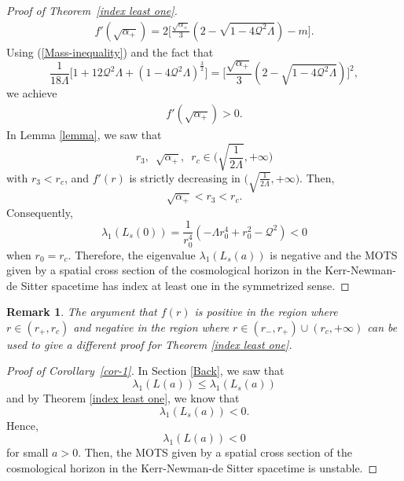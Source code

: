 \documentclass[a4paper, 11pt, reqno]{amsart}
\newtheorem{remark}{Remark}
\begin{document}
\begin{proof}[Proof of Theorem~\ref{index least one}]
\begin{eqnarray*}
    f'(\sqrt{\alpha_{+}})=
    2\Bigg[\frac{\sqrt{\alpha_{+}}}{3}(2-\sqrt{1-4\mathcal{Q}^2\Lambda})-m\Bigg].
\end{eqnarray*}
Using (\ref{Mass-inequality}) and the fact that
\begin{equation*}
    \frac{1}{18\Lambda}\Big[1+12\mathcal{Q}^2\Lambda+(1-4\mathcal{Q}^2\Lambda)^{\frac{3}{2}}\Big]=\Bigg[\frac{\sqrt{\alpha_{+}}}{3}(2-\sqrt{1-4\mathcal{Q}^2\Lambda})\Bigg]^2,
\end{equation*}
we achieve
\begin{eqnarray*}
    f'(\sqrt{\alpha_{+}})>0.
\end{eqnarray*}
In Lemma \ref{lemma}, we saw that
$$r_3,\,\,\,\sqrt{\alpha_{+}},\,\,\, r_c\in\Big(\sqrt{\frac{1}{2\Lambda}},+\infty\Big)$$
with $r_3<r_c$, and $f'(r)$ is strictly decreasing in $\Big(\sqrt{\frac{1}{2\Lambda}},+\infty\Big)$. Then,
$$\sqrt{\alpha_{+}}<r_3<r_c.$$
Consequently,
$$\lambda_1(L_s(0))=\frac{1}{r_0^4}(-\Lambda r_0^4+r_0^2-\mathcal{Q}^2)<0$$
when $r_0=r_c$. Therefore, the eigenvalue $\lambda_1(L_s(a))$ is negative and the MOTS given by a spatial cross section of the
cosmological horizon in the Kerr-Newman-de Sitter spacetime has index at least one in
the symmetrized sense.
\end{proof}
\begin{remark}
The argument that $f(r)$ is positive in the region where $r\in(r_+,r_c)$ and negative in the region where $r\in(r_{-},r_{+})\cup(r_c,+\infty)$ can be used to give a different proof for Theorem \ref{index least one}.
 \end{remark}
\begin{proof}[Proof of Corollary~\ref{cor-1}]
In Section \ref{Back}, we saw that
\begin{equation*}
    \lambda_1(L(a))\leq\lambda_1(L_s(a))
\end{equation*}
and by Theorem \ref{index least one}, we know that
\begin{equation*}
    \lambda_1(L_s(a))<0.
\end{equation*}
Hence,
\begin{equation*}
     \lambda_1(L(a))<0
\end{equation*}
for small $a>0$. Then, the MOTS given by a spatial cross section of the cosmological horizon in the Kerr-Newman-de Sitter spacetime is unstable.
\end{proof}
\end{document}
